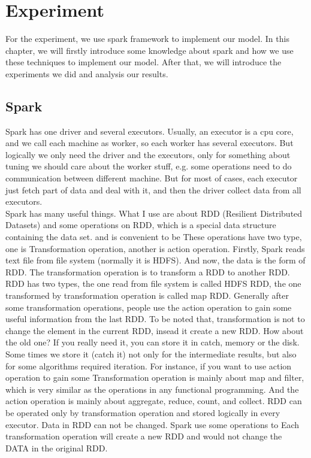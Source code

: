 \chapter{Experiment}
\label{cha:experi}

For the experiment, we use spark framework to implement our model. In this chapter, we will firstly introduce some knowledge about spark and how we use these techniques to implement our model. After that, we will introduce the experiments we did and analysis our results.


\section{Spark}

Spark has one driver and several executors. Usually, an executor is a cpu core, and we call each machine as worker, so each worker has several executors. But logically we only need the driver and the executors, only for something about tuning we should care about the worker stuff, e.g. some operations need to do communication between different machine. But for most of cases, each executor just fetch part of data and deal with it, and then the driver collect data from all executors.\\

Spark has many useful things. What I use are about RDD (Resilient Distributed Datasets) and some operations on RDD, which is a special data structure containing the data set. and is convenient to be These operations have two type, one is Transformation operation, another is action operation. Firstly, Spark reads text file from file system (normally it is HDFS). And now, the data is the form of RDD. The transformation operation is to transform a RDD to another RDD. RDD has two types, the one read from file system is called HDFS RDD, the one transformed by transformation operation is called map RDD. Generally after some transformation operations, people use the action operation to gain some useful information from the last RDD. To be noted that, transformation is not to change the element in the current RDD, insead it create a new RDD. How about the old one? If you really need it, you can store it in catch, memory or the disk. Some times we store it (catch it) not only for the intermediate results, but also for some algorithms required iteration. For instance, if you want to use action operation to gain some 
Transformation operation is mainly about map and filter, which is very similar as the operations in any functional programming. And the action operation is mainly about aggregate, reduce, count, and collect. RDD can be operated only by transformation operation and stored logically in every executor. Data in RDD can not be changed. Spark use some operations to Each transformation operation will create a new RDD and would not change the DATA in the original RDD.

